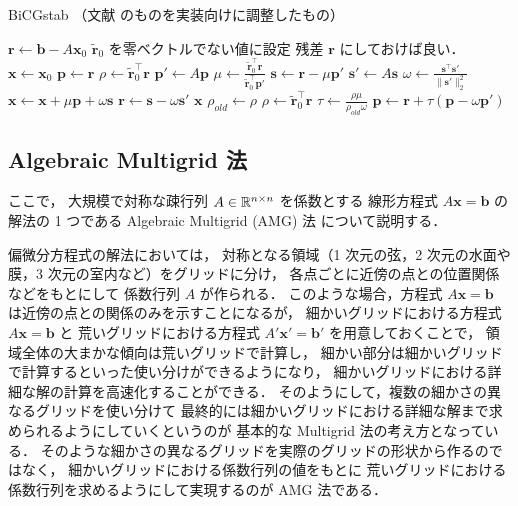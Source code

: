 \begin{algorithm}[tp]
    \caption{BiCGstab （文献 \cite{Golub2013} のものを実装向けに調整したもの）}
    \label{alg:matrix-computation_bicgstab}
    \begin{algorithmic}[1]
        \State $\bm{r} \gets \bm{b} - A \bm{x}_0$
        \State $\tilde{\bm{r}}_0$ を零ベクトルでない値に設定
        \Comment 残差 $\bm{r}$ にしておけば良い．
        \State $\bm{x} \gets \bm{x}_0$
        \State $\bm{p} \gets \bm{r}$
        \State $\rho \gets \tilde{\bm{r}}_0^\top \bm{r}$
        \Loop
        \State $\bm{p}' \gets A \bm{p}$
        \State $\mu \gets \frac{\tilde{\bm{r}}_0^\top \bm{r}}{\tilde{\bm{r}}_0^\top \bm{p}'}$
        \State $\bm{s} \gets \bm{r} - \mu \bm{p}'$
        \State $\bm{s}' \gets A \bm{s}$
        \State $\omega \gets \frac{\bm{s}^\top \bm{s}'}{\|\bm{s}'\|_2^2}$
        \State $\bm{x} \gets \bm{x} + \mu \bm{p} + \omega \bm{s}$
        \State $\bm{r} \gets \bm{s} - \omega \bm{s}'$
        \State \Return $\bm{x}$
        \EndIf
        \State $\rho_{old} \gets \rho$
        \State $\rho \gets \tilde{\bm{r}}_0^\top \bm{r}$
        \State $\tau \gets \frac{\rho \mu}{\rho_{old} \omega}$
        \State $\bm{p} \gets \bm{r} + \tau(\bm{p} - \omega \bm{p}')$
        \EndLoop
        \EndProcedure
    \end{algorithmic}
\end{algorithm}


\subsection{Algebraic Multigrid 法}


ここで，
大規模で対称な疎行列 $A \in \mathbb{R}^{n \times n}$ を係数とする
線形方程式 $A \bm{x} = \bm{b}$ の解法の 1 つである
Algebraic Multigrid (AMG) 法
\cite{Ruge1987}
について説明する．

偏微分方程式の解法においては，
対称となる領域（1 次元の弦，2 次元の水面や膜，3 次元の室内など）をグリッドに分け，
各点ごとに近傍の点との位置関係などをもとにして
係数行列 $A$ が作られる．
このような場合，方程式 $A \bm{x} = \bm{b}$ は近傍の点との関係のみを示すことになるが，
細かいグリッドにおける方程式 $A \bm{x} = \bm{b}$ と
荒いグリッドにおける方程式 $A' \bm{x}' = \bm{b}'$ を用意しておくことで，
領域全体の大まかな傾向は荒いグリッドで計算し，
細かい部分は細かいグリッドで計算するといった使い分けができるようになり，
細かいグリッドにおける詳細な解の計算を高速化することができる．
そのようにして，複数の細かさの異なるグリッドを使い分けて
最終的には細かいグリッドにおける詳細な解まで求められるようにしていくというのが
基本的な Multigrid 法の考え方となっている．
そのような細かさの異なるグリッドを実際のグリッドの形状から作るのではなく，
細かいグリッドにおける係数行列の値をもとに
荒いグリッドにおける係数行列を求めるようにして実現するのが
AMG 法である．

